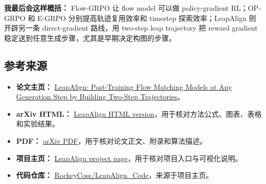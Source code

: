 \begin{summarybox}
\textbf{我最后会这样概括：} Flow-GRPO 让 flow model 可以做 policy-gradient RL；OP-GRPO 和 E-GRPO 分别提高轨迹复用效率和 timestep 探索效率；LeapAlign 则开辟另一条 direct-gradient 路线，用 two-step leap trajectory 把 reward gradient 稳定送到任意生成步骤，尤其是早期决定构图的步骤。
\end{summarybox}

\subsection{参考来源}

\begin{itemize}[leftmargin=1.5em]
  \item \textbf{论文主页：} \href{https://arxiv.org/abs/2604.15311}{LeapAlign: Post-Training Flow Matching Models at Any Generation Step by Building Two-Step Trajectories}。
  \item \textbf{arXiv HTML：} \href{https://arxiv.org/html/2604.15311v2}{LeapAlign HTML version}，用于核对方法公式、图表、表格和实验结果。
  \item \textbf{PDF：} \href{https://arxiv.org/pdf/2604.15311}{arXiv PDF}，用于核对论文正文、附录和算法描述。
  \item \textbf{项目主页：} \href{https://rockeycoss.github.io/leapalign/}{LeapAlign project page}，用于核对项目入口与可视化说明。
  \item \textbf{代码仓库：} \href{https://github.com/RockeyCoss/LeapAlign_Code}{RockeyCoss/LeapAlign\_Code}，来源于项目主页。
\end{itemize}
